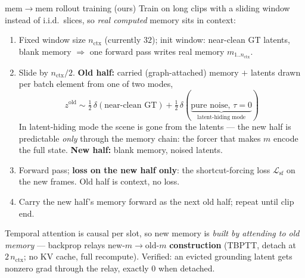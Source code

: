 \documentclass[10pt,aspectratio=169]{beamer}
\newcommand{\mem}{m}
\begin{document}
\begin{frame}{mem$\to$mem rollout training (ours)}
Train on long clips with a sliding window instead of i.i.d.\ slices, so \emph{real computed} memory sits in context:
\begin{enumerate}
  \item Fixed window size $n_{\text{ctx}}$ (currently $32$); init window: near-clean GT latents, blank
        memory $\Rightarrow$ one forward pass writes real memory $\mem_{1..n_{\text{ctx}}}$.
  \item Slide by $n_{\text{ctx}}/2$. \textbf{Old half:} carried (graph-attached) memory $+$ latents drawn
        per batch element from one of two modes,
  \[
  z^{\text{old}} \sim \tfrac12\,\delta(\text{near-clean GT}) + \tfrac12\,\delta(\underbrace{\text{pure noise, } \tau{=}0}_{\text{latent-hiding mode}})
  \]
  In latent-hiding mode the scene is gone from the latents --- the new half is predictable \emph{only}
  through the memory chain: the forcer that makes $\mem$ encode the full state.
  \textbf{New half:} blank memory, noised latents.
  \item Forward pass; \textbf{loss on the new half only}: the shortcut-forcing loss $\mathcal{L}_{\text{sf}}$
        on the new frames. Old half is context, no loss.
  \item Carry the new half's memory forward as the next old half; repeat until clip end.
\end{enumerate}
Temporal attention is causal per slot, so new memory is \emph{built by attending to old memory} ---
backprop relays $\text{new-}\mem \to \text{old-}\mem$ \textbf{construction} (TBPTT, detach at
$2\,n_{\text{ctx}}$; no KV cache, full recompute). Verified: an evicted grounding latent gets nonzero grad through the relay,
exactly $0$ when detached.
\end{frame}
\end{document}
